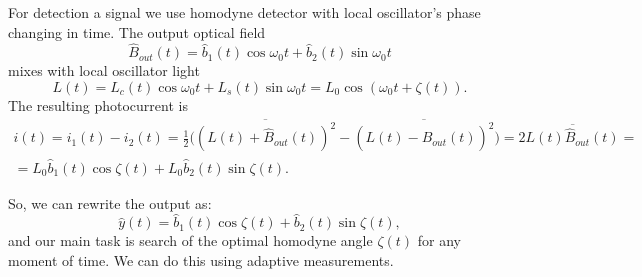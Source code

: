 For detection a signal we use homodyne detector with local oscillator's phase changing in time. The output optical field
\begin{equation}
 \hat{B}_{out}(t) = \hat{b}_1(t)\cos \omega_0 t +  \hat{b}_2(t) \sin \omega_0 t
\end{equation}
mixes with local oscillator light
\begin{equation}
 L(t)=L_c(t)\cos \omega_0 t + L_s (t) \sin \omega_0 t = L_0 \cos (\omega_0 t + \zeta(t)).
\end{equation}
The resulting photocurrent is
\begin{multline}
 i(t) = i_1(t)-i_2(t) = \frac{1}{2}\bigl( \overline{(L(t)+\hat{B}_{out}(t))^2}- \overline{(L(t)-\hat{B}_{out}(t))^2}\bigr) = 2 \overline{L(t)\hat{B}_{out}(t)} =\\
=L_0 \hat{b}_1(t)\cos \zeta(t) +  L_0 \hat{b}_2(t) \sin \zeta(t).
\end{multline}

So, we can rewrite the output as:
\begin{equation}\label{gen_y}
 \hat{y}(t) = \hat{b}_1(t)\cos \zeta(t) +  \hat{b}_2(t) \sin \zeta(t),
\end{equation}
and our main task is search of the optimal homodyne angle $\zeta(t)$ for any moment of time. We can do this using adaptive measurements.


